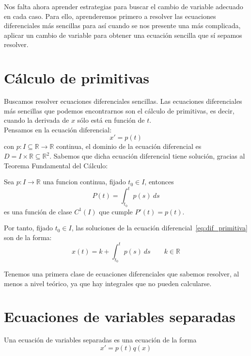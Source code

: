 Nos falta ahora aprender estrategias para buscar el cambio de variable adecuado en cada caso. Para ello, aprenderemos primero a resolver las ecuaciones diferenciales más sencillas para así cuando se nos presente una más complicada, aplicar un cambio de variable para obtener una ecuación sencilla que sí sepamos resolver.

\section{Cálculo de primitivas}
Buscamos resolver ecuaciones diferenciales sencillas. Las ecuaciones diferenciales más sencillas que podemos encontrarnos son el cálculo de primitivas, es decir, cuando la derivada de $x$ sólo está en función de $t$.\\

Pensamos en la ecuación diferencial:
\begin{equation}\label{eq:dif_primitiva}
    x' = p(t)
\end{equation}
con $p:I\subseteq \mathbb{R}\rightarrow\mathbb{R}$ continua, el dominio de la ecuación diferencial es $D = I\times \mathbb{R}\subseteq \mathbb{R}^2$. Sabemos que dicha ecuación diferencial tiene solución, gracias al Teorema Fundamental del Cálculo:

\begin{teo}
    Sea $p:I\rightarrow\mathbb{R}$ una funcion continua, fijado $t_0\in I$, entonces
    \begin{equation*}
        P(t) = \int_{t_0}^{t} p(s)~ds 
    \end{equation*}
    es una función de clase $C^1(I)$ que cumple $P'(t) = p(t)$.
\end{teo}
Por tanto, fijado $t_0 \in I$, las soluciones de la ecuación diferencial~\ref{eq:dif_primitiva} son de la forma:
\begin{equation*}
    x(t) = k + \int_{t_0}^{t} p(s)~ds  \qquad k\in \mathbb{R}
\end{equation*}

Tenemos una primera clase de ecuaciones diferenciales que sabemos resolver, al menos a nivel teórico, ya que hay integrales que no pueden calcularse.

\section{Ecuaciones de variables separadas}
Una ecuación de variables separadas es una ecuación de la forma
\begin{equation*}
    x' = p(t) q(x)
\end{equation*}

